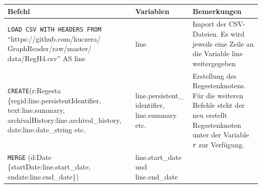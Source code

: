 \documentclass[ngerman,]{scrreprt}
\begin{document}
\begin{longtable}[]{@{}lll@{}}
\toprule
\begin{minipage}[b]{0.31\columnwidth}\raggedright
Befehl\strut
\end{minipage} & \begin{minipage}[b]{0.23\columnwidth}\raggedright
Variablen\strut
\end{minipage} & \begin{minipage}[b]{0.37\columnwidth}\raggedright
Bemerkungen\strut
\end{minipage}\tabularnewline
\midrule
\endhead
\begin{minipage}[t]{0.31\columnwidth}\raggedright
\texttt{LOAD\ CSV\ WITH\ HEADERS\ FROM} ``https://github.com/kuczera/ GraphReader/raw/master/ data/RegH4.csv'' AS line\strut
\end{minipage} & \begin{minipage}[t]{0.23\columnwidth}\raggedright
line\strut
\end{minipage} & \begin{minipage}[t]{0.37\columnwidth}\raggedright
Import der CSV-Dateien. Es wird jeweils eine Zeile an die Variable line weitergegeben\strut
\end{minipage}\tabularnewline
\begin{minipage}[t]{0.31\columnwidth}\raggedright
\texttt{CREATE}(r:Regesta \{regid:line.persistentIdentifier, text:line.summary, archivalHistory:line.archival\_history, date:line.date\_string etc. \strut
\end{minipage} & \begin{minipage}[t]{0.23\columnwidth}\raggedright
line.persistent\_ identifier, line.summary etc.\strut
\end{minipage} & \begin{minipage}[t]{0.37\columnwidth}\raggedright
Erstellung des Regestenknotens. Für die weiteren Befehle steht der neu erstellt Regestenknoten unter der Variable \texttt{r} zur Verfügung.\strut
\end{minipage}\tabularnewline
\begin{minipage}[t]{0.31\columnwidth}\raggedright
\texttt{MERGE} (d:Date \{startDate:line.start\_date, endate:line.end\_date\})\strut
\end{minipage} & \begin{minipage}[t]{0.23\columnwidth}\raggedright
line.start\_date und line.end\_date\strut
\end{minipage} & \begin{minipage}[t]{0.37\columnwidth}\raggedright

\end{minipage}
\end{longtable}
\end{document}
